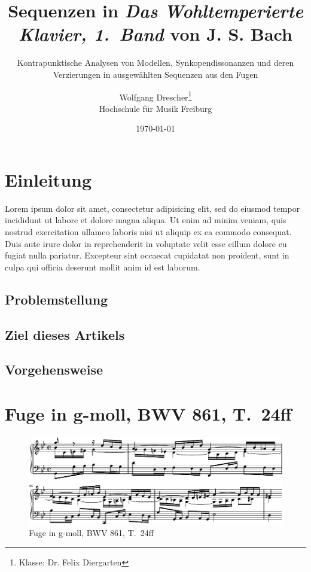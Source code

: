\documentclass[a4paper]{scrartcl}
\title{Sequenzen in \emph{Das Wohltemperierte Klavier, 1.~Band} von J. S. Bach}
\subtitle{Kontrapunktische Analysen von Modellen, Synkopendissonanzen und deren Verzierungen in ausgewählten Sequenzen aus den Fugen}
\author{
	Wolfgang Drescher\thanks{Klasse: Dr. Felix Diergarten}\\
	Hochschule für Musik Freiburg
}
\date{\today}
\begin{document}
\maketitle

\tableofcontents

\section{Einleitung}

Lorem ipsum dolor sit amet, consectetur adipisicing elit, sed do eiusmod tempor incididunt ut labore et dolore magna aliqua. Ut enim ad minim veniam, quis nostrud exercitation ullamco laboris nisi ut aliquip ex ea commodo consequat. Duis aute irure dolor in reprehenderit in voluptate velit esse cillum dolore eu fugiat nulla pariatur. Excepteur sint occaecat cupidatat non proident, sunt in culpa qui officia deserunt mollit anim id est laborum.

\subsection{Problemstellung}

\subsection{Ziel dieses Artikels}

\subsection{Vorgehensweise}

\section{Fuge in g-moll, BWV 861, T.~24ff}

\begin{figure}[htbp]
	\centering
	\includegraphics{lilypond/g-moll/render/original}
	\caption{Fuge in g-moll, BWV 861, T.~24ff}
	\label{fig:bwv681-original}
\end{figure}

\listoffigures
\end{document}

